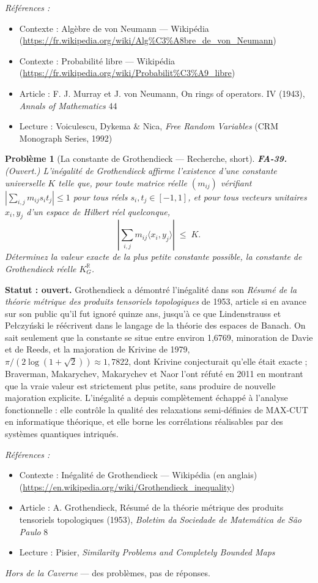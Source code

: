 \documentclass[11pt]{article}
\newtheorem{problem}{Problème}
\newenvironment{refs}{\par\small\noindent\emph{Références :}\begin{itemize}\setlength\itemsep{0pt}}{\end{itemize}\normalsize}
\begin{document}
\begin{refs}
\item Contexte : Algèbre de von Neumann --- Wikipédia (\url{https://fr.wikipedia.org/wiki/Alg%C3%A8bre_de_von_Neumann})
\item Contexte : Probabilité libre --- Wikipédia (\url{https://fr.wikipedia.org/wiki/Probabilit%C3%A9_libre})
\item Article : F. J. Murray et J. von Neumann, \og{} On rings of operators. IV \fg{} (1943), \textit{Annals of Mathematics} 44
\item Lecture : Voiculescu, Dykema \& Nica, \textit{Free Random Variables} (CRM Monograph Series, 1992)
\end{refs}

\bigskip

\begin{problem}[{La constante de Grothendieck --- Recherche, short}]
\textbf{FA-39.} (Ouvert.) L'inégalité de Grothendieck affirme l'existence d'une
constante universelle $ K $ telle que, pour toute matrice réelle $ (m_{ij}) $ vérifiant
$ \left| \sum_{i,j} m_{ij} s_i t_j \right| \le 1 $ pour tous réels
$ s_i, t_j \in [-1, 1] $, et pour tous vecteurs unitaires $ x_i, y_j $ d'un espace de Hilbert réel
quelconque,
\[ \left| \sum_{i,j} m_{ij} \langle x_i, y_j \rangle \right| \;\le\; K . \]
Déterminez la valeur exacte de la plus petite constante possible, la constante de Grothendieck réelle
$ K_G^{\mathbb{R}} $.
\end{problem}

\noindent \textbf{Statut : ouvert.} Grothendieck a démontré l'inégalité dans son
\textit{Résumé de la théorie métrique des produits tensoriels topologiques} de 1953, article si en avance sur
son public qu'il fut ignoré quinze ans, jusqu'à ce que Lindenstrauss et Pe\l{}czy\'nski le réécrivent dans le
langage de la théorie des espaces de Banach. On sait seulement que la constante se situe entre environ
1,6769, minoration de Davie et de Reeds, et la majoration de Krivine de 1979,
$ \pi / (2\log(1+\sqrt{2})) \approx 1{,}7822 $, dont Krivine conjecturait qu'elle était exacte ;
Braverman, Makarychev, Makarychev et Naor l'ont réfuté en 2011 en montrant que la vraie valeur est
strictement plus petite, sans produire de nouvelle majoration explicite. L'inégalité a depuis complètement
échappé à l'analyse fonctionnelle : elle contrôle la qualité des relaxations semi-définies de MAX-CUT en
informatique théorique, et elle borne les corrélations réalisables par des systèmes quantiques
intriqués.

\begin{refs}
\item Contexte : Inégalité de Grothendieck --- Wikipédia (en anglais) (\url{https://en.wikipedia.org/wiki/Grothendieck_inequality})
\item Article : A. Grothendieck, \og{} Résumé de la théorie métrique des produits tensoriels topologiques \fg{} (1953), \textit{Boletim da Sociedade de Matemática de São Paulo} 8
\item Lecture : Pisier, \textit{Similarity Problems and Completely Bounded Maps}
\end{refs}

\bigskip


\vfill
\noindent\emph{Hors de la Caverne} --- des probl\`emes, pas de r\'eponses.
\end{document}
